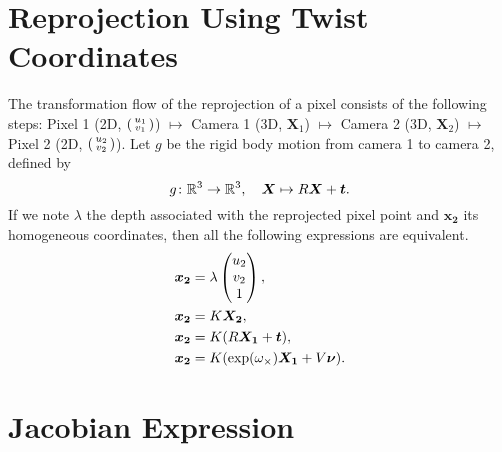 \section{Reprojection Using Twist Coordinates}%
\label{sec:reprojection_using_twist_coordinates}

The transformation flow of the reprojection of a pixel consists of the following steps:
Pixel 1 (2D, $\left(\begin{smallmatrix} u_1 \\ v_1 \end{smallmatrix} \right)$)
	$\mapsto$ Camera 1 (3D, $\bm{X}_1$)
	$\mapsto$ Camera 2 (3D, $\bm{X}_2$)
	$\mapsto$ Pixel 2 (2D, $\left(\begin{smallmatrix} u_2 \\ v_2 \end{smallmatrix} \right)$).
Let $g$ be the rigid body motion from camera 1 to camera 2, defined by
\[
	g \colon \mathbb{R}^3 \to \mathbb{R}^3 ,\quad \bm{X} \mapsto R\bm{X} + \bm{t}.
\]
If we note $\lambda$ the depth associated with the reprojected pixel point and
$\bm{x_2}$ its homogeneous coordinates, then all the following expressions are equivalent.
\begin{subequations}
\begin{align}
	\bm{x_2} &= \lambda \begin{pmatrix} {u_2} \\ {v_2} \\ {1} \end{pmatrix}, \label{eq:x2_homogeneous}\\
	\bm{x_2} &= K \bm{X_2}, \\
	\bm{x_2} &= K ( R\bm{X_1} + \bm{t} ), \\
	\bm{x_2} &= K ( \exp({\omega}_{\times}) \bm{X_1} + V \bm{\nu} ). \label{eq:x2_twist}
\end{align}
\end{subequations}

\section{Jacobian Expression}%
\label{sec:jacobian_expression}

